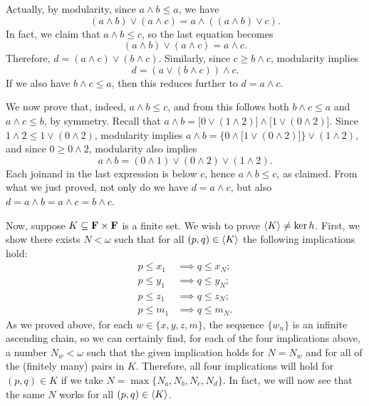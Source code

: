 Actually, by modularity, since $a\wedge b \leq a$, we have 
\[
(a \wedge b) \vee (a \wedge c) = a \wedge ((a\wedge b) \vee c).
\]
In fact, we claim that $a\wedge b \leq c$, so the last equation becomes 
\[
(a \wedge b) \vee (a \wedge c) = a \wedge c.
\]
Therefore, $d = (a \wedge c) \vee (b \wedge c)$. Similarly, since 
$c \geq b \wedge c$, modularity implies 
\[ 
d = (a \vee (b \wedge c)) \wedge c.
\]
If we also have $b \wedge c \leq a$, then this reduces further to $d = a  \wedge c$.

We now prove that, indeed, $a\wedge b \leq c$, and from this follows both $b \wedge c\leq a$ and $a \wedge c\leq b$, by symmetry. Recall that 
$a \wedge b = \bigl[0\vee (1 \wedge 2)\bigr] \wedge \bigl[1\vee (0 \wedge 2)\bigr]$.
Since $1 \wedge 2 \leq 1\vee (0 \wedge 2)$, modularity implies
$a \wedge b = \bigl\{0\wedge \bigl[1\vee (0 \wedge 2)\bigr]\bigr\} \vee 
(1 \wedge 2)$, and since $0 \geq 0 \wedge 2$, modularity also implies
\[
a \wedge b = (0\wedge 1)\vee (0 \wedge 2) \vee (1 \wedge 2).
\]
Each joinand in the last expression is below $c$,
hence $a\wedge b \leq c$, as claimed.
From what we just proved, not only do we have $d = a \wedge c$, but also 
$d = a\wedge b = a\wedge c = b \wedge c$.

Now, suppose $K \subseteq \mathbf{F} \times \mathbf{F}$ is a finite set. 
We wish to prove $\langle K\rangle \neq \ker h$.
First, we show there exists $N < \omega$ such that 
for all $(p, q) \in \langle K\rangle$ 
the following implications hold:
\begin{align}
p \leq x_1 &\implies q \leq x_N; \label{eq:acc01}\\
p \leq y_1 &\implies q \leq y_N; \label{eq:acc02}\\ 
p \leq z_1 &\implies q \leq z_N; \label{eq:acc03}\\
p \leq m_1 &\implies q \leq m_N. \label{eq:acc04}
\end{align}
As we proved above, for each $w \in \{x, y, z, m\}$, the sequence $\{w_n\}$
is an infinite ascending chain, so we can certainly find, for each of the four
implications above, a number $N_w < \omega$ such that the given implication
holds for $N = N_w$ and for all of the (finitely many) pairs in $K$. 
Therefore, all four implications will hold for $(p, q) \in K$ if we take 
$N = \max \{N_a, N_b, N_c, N_d\}$. In fact, we will now see that the same $N$
works for all $(p, q) \in \langle K\rangle$.

